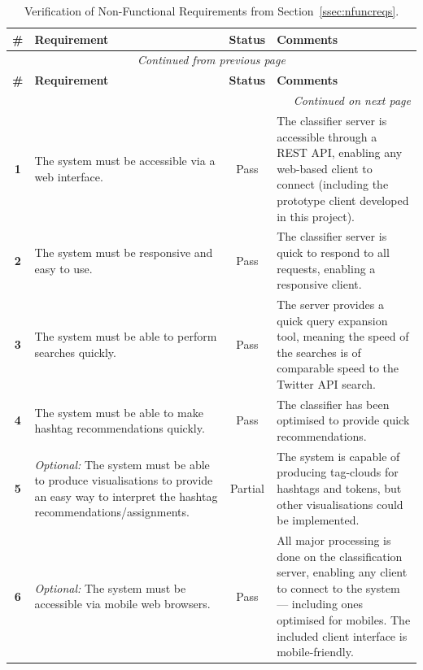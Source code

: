 \documentclass[11pt,a4paper]{report}
\begin{document}
\begin{center}
    \begin{longtable}{|c|p{5.5cm}||c|p{5cm}|}
        \hline
        \textbf{\#} & \textbf{Requirement} & \textbf{Status} & \textbf{Comments} \\
        \hline
        \hline
        \endfirsthead
        \multicolumn{4}{c}{\textit{Continued from previous page}} \\
        \hline
        \textbf{\#} & \textbf{Requirement} & \textbf{Status} & \textbf{Comments} \\
        \hline
        \hline
        \endhead
        \hline
        \multicolumn{4}{r}{\textit{Continued on next page}} \\
        \endfoot
        \hline
        \caption{Verification of Non-Functional Requirements from Section~\ref{ssec:nfuncreqs}.}
        \endlastfoot
        \textbf{1} & The system must be accessible via a web interface. & Pass & The classifier server is accessible through a REST API, enabling any web-based client to connect (including the prototype client developed in this project). \\
        \hline
        \textbf{2} & The system must be responsive and easy to use. & Pass & The classifier server is quick to respond to all requests, enabling a responsive client. \\
        \hline
        \textbf{3} & The system must be able to perform searches quickly. & Pass & The server provides a quick query expansion tool, meaning the speed of the searches is of comparable speed to the Twitter API search. \\
        \hline
        \textbf{4} & The system must be able to make hashtag recommendations quickly. & Pass & The classifier has been optimised to provide quick recommendations. \\
        \hline
        \textbf{5} & \emph{Optional:} The system must be able to produce visualisations to provide an easy way to interpret the hashtag recommendations/assignments. & Partial & The system is capable of producing tag-clouds for hashtags and tokens, but other visualisations could be implemented. \\
        \hline
        \textbf{6} & \emph{Optional:} The system must be accessible via mobile web browsers. & Pass & All major processing is done on the classification server, enabling any client to connect to the system --- including ones optimised for mobiles. The included client interface is mobile-friendly. \\
    \end{longtable}
\end{center}
\end{document}
